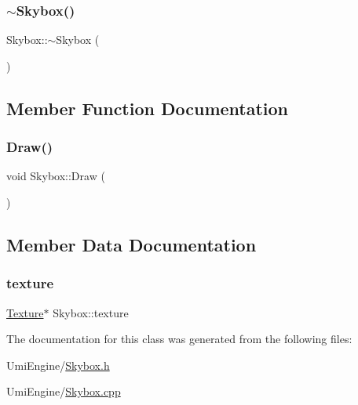 \subsubsection{\texorpdfstring{$\sim$Skybox()}{~Skybox()}}
{\footnotesize\ttfamily Skybox\+::$\sim$\+Skybox (\begin{DoxyParamCaption}{ }\end{DoxyParamCaption})}



\subsection{Member Function Documentation}
\mbox{\label{class_skybox_a8bf85652e4f0559530eb7a1f5ed87439}} 
\subsubsection{\texorpdfstring{Draw()}{Draw()}}
{\footnotesize\ttfamily void Skybox\+::\+Draw (\begin{DoxyParamCaption}{ }\end{DoxyParamCaption})}



\subsection{Member Data Documentation}
\mbox{\label{class_skybox_a6e1ace9b3bcf2c50136a833d2a1d2118}} 
\subsubsection{\texorpdfstring{texture}{texture}}
{\footnotesize\ttfamily \mbox{\hyperlink{class_texture}{Texture}}$\ast$ Skybox\+::texture}



The documentation for this class was generated from the following files\+:\begin{DoxyCompactItemize}
\item 
Umi\+Engine/\mbox{\hyperlink{_skybox_8h}{Skybox.\+h}}\item 
Umi\+Engine/\mbox{\hyperlink{_skybox_8cpp}{Skybox.\+cpp}}\end{DoxyCompactItemize}
